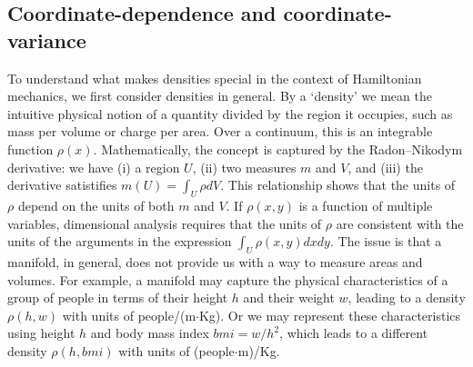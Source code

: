 \documentclass[letterpaper]{article}
\begin{document}

\subsection{Coordinate-dependence and coordinate-variance}
\label{dependence}


To understand what makes densities special in the context of Hamiltonian mechanics, we first consider densities in general. By a `density' we mean the intuitive physical notion of a quantity divided by the region it occupies, such as mass per volume or charge per area. Over a continuum, this is an integrable function $\rho(x)$. Mathematically, the concept is captured by the Radon–Nikodym derivative: we have (i) a region $U$, (ii) two measures $m$ and $V$, and (iii) the derivative satistifies $m(U) = \int_U \rho dV$. This relationship shows that the units of $\rho$ depend on the units of both $m$ and $V$. If $\rho(x, y)$ is a function of multiple variables, dimensional analysis requires that the units of $\rho$ are consistent with the units of the arguments in the expression $\int_U \rho(x, y) dx dy$. The issue is that a manifold, in general, does not provide us with a way to measure areas and volumes. For example, a manifold may capture the physical characteristics of a group of people in terms of their height $h$ and their weight $w$, leading to a density $\rho(h,w)$ with units of people/(m$\cdot$Kg). Or we may represent these characteristics using height $h$ and body mass index $bmi = w / h^2$, which leads to a different density $\rho(h,bmi)$ with units of (people$\cdot$m)/Kg.


\end{document}
